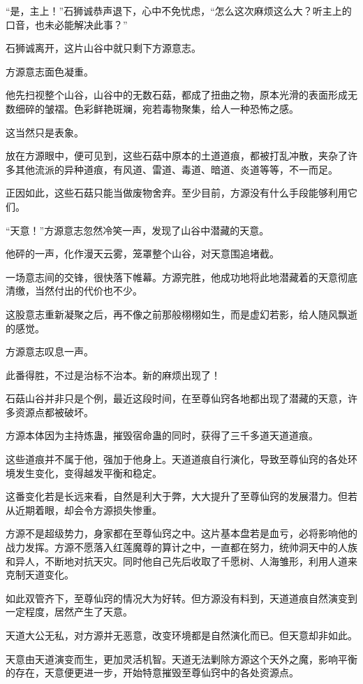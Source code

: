 \begin{this_body}
“是，主上！”石狮诚恭声退下，心中不免忧虑，“怎么这次麻烦这么大？听主上的口音，也未必能解决此事？”

石狮诚离开，这片山谷中就只剩下方源意志。

方源意志面色凝重。

他先扫视整个山谷，山谷中的无数石菇，都成了扭曲之物，原本光滑的表面形成无数细碎的皱褶。色彩鲜艳斑斓，宛若毒物聚集，给人一种恐怖之感。

这当然只是表象。

放在方源眼中，便可见到，这些石菇中原本的土道道痕，都被打乱冲散，夹杂了许多其他流派的异种道痕，有风道、雷道、毒道、暗道、炎道等等，不一而足。

正因如此，这些石菇只能当做废物舍弃。至少目前，方源没有什么手段能够利用它们。

“天意！”方源意志忽然冷笑一声，发现了山谷中潜藏的天意。

他砰的一声，化作漫天云雾，笼罩整个山谷，对天意围追堵截。

一场意志间的交锋，很快落下帷幕。方源完胜，他成功地将此地潜藏着的天意彻底清缴，当然付出的代价也不少。

这股意志重新凝聚之后，再不像之前那般栩栩如生，而是虚幻若影，给人随风飘逝的感觉。

方源意志叹息一声。

此番得胜，不过是治标不治本。新的麻烦出现了！

石菇山谷并非只是个例，最近这段时间，在至尊仙窍各地都出现了潜藏的天意，许多资源点都被破坏。

方源本体因为主持炼蛊，摧毁宿命蛊的同时，获得了三千多道天道道痕。

这些道痕并不属于他，强加于他身上。天道道痕自行演化，导致至尊仙窍的各处环境发生变化，变得越发平衡和稳定。

这番变化若是长远来看，自然是利大于弊，大大提升了至尊仙窍的发展潜力。但若从近期着眼，却会令方源损失惨重。

方源不是超级势力，身家都在至尊仙窍之中。这片基本盘若是血亏，必将影响他的战力发挥。方源不愿落入红莲魔尊的算计之中，一直都在努力，统帅洞天中的人族和异人，不断地对抗天灾。同时他自己先后收取了千愿树、人海雏形，利用人道来克制天道变化。

如此双管齐下，至尊仙窍的情况大为好转。但方源没有料到，天道道痕自然演变到一定程度，居然产生了天意。

天道大公无私，对方源并无恶意，改变环境都是自然演化而已。但天意却非如此。

天意由天道演变而生，更加灵活机智。天道无法剿除方源这个天外之魔，影响平衡的存在，天意便更进一步，开始特意摧毁至尊仙窍中的各处资源点。


\end{this_body}
